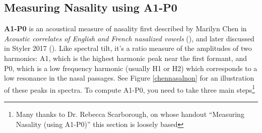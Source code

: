 \hypertarget{measuring-nasality-using-a1-p0}{%
\subsection{Measuring Nasality using
A1-P0}\label{measuring-nasality-using-a1-p0}}

\label{a1p0}

\textbf{A1-P0} is an acoustical measure of nasality first described by
Marilyn Chen in \emph{Acoustic correlates of English and French
nasalized vowels} (\cite{Chen:1997vr}), and later discussed in Styler
2017 (\cite{Styler:2017}). Like spectral tilt, it's a ratio measure of
the amplitudes of two harmonics: A1, which is the highest harmonic peak
near the first formant, and P0, which is a low frequency harmonic
(usually H1 or H2) which corresponds to a low resonance in the nasal
passages. See Figure \ref{chennasalnon} for an illustration of these
peaks in spectra. To compute A1-P0, you need to take three main
steps\footnote{Many thanks to Dr. Rebecca Scarborough, on whose handout “Measuring Nasality (using A1-P0)” this section is loosely based}

